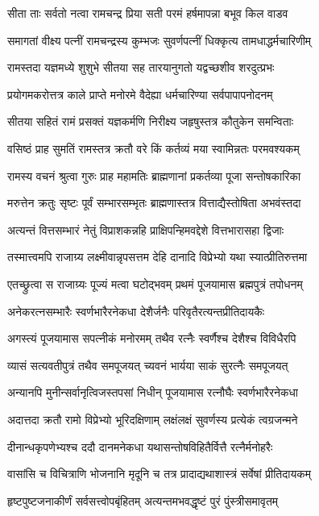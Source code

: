 \twolineshloka
{सीता ताः सर्वतो नत्वा रामचन्द्र प्रिया सती}
{परमं हर्षमापन्ना बभूव किल वाडव}%

\twolineshloka
{समागतां वीक्ष्य पत्नीं रामचन्द्रस्य कुम्भजः}
{सुवर्णपत्नीं धिक्कृत्य तामधाद्धर्मचारिणीम्}%

\twolineshloka
{रामस्तदा यज्ञमध्ये शुशुभे सीतया सह}
{तारयानुगतो यद्वच्छशीव शरदुत्प्रभः}%

\twolineshloka
{प्रयोगमकरोत्तत्र काले प्राप्ते मनोरमे}
{वैदेह्या धर्मचारिण्या सर्वपापापनोदनम्}%

\twolineshloka
{सीतया सहितं रामं प्रसक्तं यज्ञकर्मणि}
{निरीक्ष्य जहृषुस्तत्र कौतुकेन समन्विताः}%

\twolineshloka
{वसिष्ठं प्राह सुमतिं रामस्तत्र क्रतौ वरे}
{किं कर्तव्यं मया स्वामिन्नतः परमवश्यकम्}%

\twolineshloka
{रामस्य वचनं श्रुत्वा गुरुः प्राह महामतिः}
{ब्राह्मणानां प्रकर्तव्या पूजा सन्तोषकारिका}%

\twolineshloka
{मरुत्तेन क्रतुः सृष्टः पूर्वं सम्भारसम्भृतः}
{ब्राह्मणास्तत्र वित्ताद्यैस्तोषिता अभवंस्तदा}%

\twolineshloka
{अत्यन्तं वित्तसम्भारं नेतुं विप्राशकन्नहि}
{प्राक्षिपन्हिमवद्देशे वित्तभारासहा द्विजाः}%

\twolineshloka
{तस्मात्त्वमपि राजाग्र्य लक्ष्मीवान्नृपसत्तम}
{देहि दानादि विप्रेभ्यो यथा स्यात्प्रीतिरुत्तमा}%

\twolineshloka
{एतच्छ्रुत्वा स राजाग्र्यः पूज्यं मत्वा घटोद्भवम्}
{प्रथमं पूजयामास ब्रह्मपुत्रं तपोधनम्}%

\twolineshloka
{अनेकरत्नसम्भारैः स्वर्णभारैरनेकधा}
{देशैर्जनैः परिवृतैरत्यन्तप्रीतिदायकैः}%

\twolineshloka
{अगस्त्यं पूजयामास सपत्नीकं मनोरमम्}
{तथैव रत्नैः स्वर्णैश्च देशैश्च विविधैरपि}%

\twolineshloka
{व्यासं सत्यवतीपुत्रं तथैव समपूजयत्}
{च्यवनं भार्यया साकं सुरत्नैः समपूजयत्}%

\twolineshloka
{अन्यानपि मुनीन्सर्वानृत्विजस्तपसां निधीन्}
{पूजयामास रत्नौघैः स्वर्णभारैरनेकधा}%

\twolineshloka
{अदात्तदा क्रतौ रामो विप्रेभ्यो भूरिदक्षिणाम्}
{लक्षंलक्षं सुवर्णस्य प्रत्येकं त्वग्रजन्मने}%

\twolineshloka
{दीनान्धकृपणेभ्यश्च ददौ दानमनेकधा}
{यथासन्तोषविहितैर्वित्तै रत्नैर्मनोहरैः}%

\twolineshloka
{वासांसि च विचित्राणि भोजनानि मृदूनि च}
{तत्र प्रादाद्यथाशास्त्रं सर्वेषां प्रीतिदायकम्}%

\twolineshloka
{हृष्टपुष्टजनाकीर्णं सर्वसत्त्वोपबृंहितम्}
{अत्यन्तमभवद्धृष्टं पुरं पुंस्त्रीसमावृतम्}%

